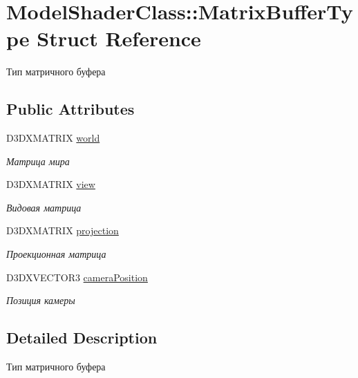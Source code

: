 \hypertarget{struct_model_shader_class_1_1_matrix_buffer_type}{}\section{Model\+Shader\+Class\+:\+:Matrix\+Buffer\+Type Struct Reference}
\label{struct_model_shader_class_1_1_matrix_buffer_type}


Тип матричного буфера  


\subsection*{Public Attributes}
\begin{DoxyCompactItemize}
\item 
D3\+D\+X\+M\+A\+T\+R\+IX \hyperlink{struct_model_shader_class_1_1_matrix_buffer_type_aed066876b9ef3711cd691e89001011e7}{world}
\begin{DoxyCompactList}\small\item\em Матрица мира \end{DoxyCompactList}\item 
D3\+D\+X\+M\+A\+T\+R\+IX \hyperlink{struct_model_shader_class_1_1_matrix_buffer_type_abf71d145afaa507525985cfeb2dc40cf}{view}
\begin{DoxyCompactList}\small\item\em Видовая матрица \end{DoxyCompactList}\item 
D3\+D\+X\+M\+A\+T\+R\+IX \hyperlink{struct_model_shader_class_1_1_matrix_buffer_type_aa90f866198cc990623f75672f593cc36}{projection}
\begin{DoxyCompactList}\small\item\em Проекционная матрица \end{DoxyCompactList}\item 
D3\+D\+X\+V\+E\+C\+T\+O\+R3 \hyperlink{struct_model_shader_class_1_1_matrix_buffer_type_a2cb8de3c98e5cbf0d3512d9e71d16e34}{camera\+Position}
\begin{DoxyCompactList}\small\item\em Позиция камеры \end{DoxyCompactList}\end{DoxyCompactItemize}


\subsection{Detailed Description}
Тип матричного буфера 

